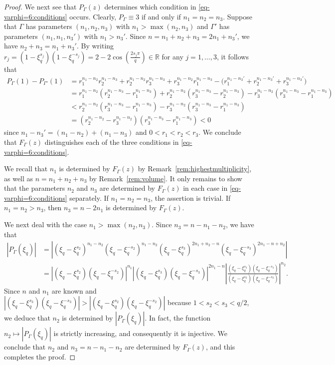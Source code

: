 \documentclass[12pt,a4paper,final]{amsart}
\theoremstyle{plain}
\theoremstyle{definition}
\theoremstyle{remark}
\numberwithin{equation}{section}
\newcommand{\R}{\mathbb R}
\begin{document}
\begin{proof}
We next see that $P_{\Gamma}(z)$ determines which condition in \eqref{eq-varphi=6:conditions} occurs. 
Clearly, $P_{\Gamma}\equiv 3$ if and only if $n_1=n_2=n_3$. 
Suppose that $\Gamma$ has parameters $(n_1,n_2,n_3)$ with $n_1>\max(n_2,n_3)$ and $\Gamma'$ has parameters  $(n_1,n_1,n_3')$ with $n_1>n_3'$. 
Since $n=n_1+n_2+n_3=2n_1+n_3'$, we have $n_2+n_3=n_1+n_3'$. 
By writing $r_j=(1-\xi_q^{s_j})(1-\xi_q^{-s_j}) =2-2\cos(\tfrac{2s_j\pi}{q})\in\R$ for any $j=1,\dots,3$, it follows that
\begin{equation}\label{eq-varphi=6:P(1)-P'(1)}
\begin{aligned}
P_{\Gamma}(1)-P_{\Gamma'}(1)&
	= r_1^{n_1-n_2}r_2^{n_1-n_3} 
	+ r_2^{n_1-n_2}r_3^{n_1-n_3} 
	+ r_3^{n_1-n_2}r_1^{n_1-n_3} 
	-\big(r_1^{n_1-n_3'} +r_2^{n_1-n_3'} +r_3^{n_1-n_3'} \big)
%
%
\\ &
	= r_1^{n_1-n_2} (r_2^{n_1-n_3} - r_1^{n_1-n_3})
	+ r_2^{n_1-n_2} (r_3^{n_1-n_3} - r_2^{n_1-n_3})
	- r_3^{n_1-n_2} (r_3^{n_1-n_3} - r_1^{n_1-n_3}) 
%
%
\\ &
	< r_2^{n_1-n_2} (r_3^{n_1-n_3} - r_1^{n_1-n_3})
	- r_3^{n_1-n_2} (r_3^{n_1-n_3} - r_1^{n_1-n_3}) 
%
%
\\ &
	= (r_2^{n_1-n_2} - r_3^{n_1-n_2})
	(r_3^{n_1-n_3} - r_1^{n_1-n_3})<0
\end{aligned}
\end{equation}
since $n_1-n_3'= (n_1-n_2)+(n_1-n_3)$ and $0<r_1<r_2<r_3$. 
We conclude that $F_{\Gamma}(z)$ distinguishes each of the three conditions in \eqref{eq-varphi=6:conditions}. 

We recall that $n_1$ is determined by $F_{\Gamma}(z)$ by Remark~\ref{rem:highestmultiplicity}, as well as $n=n_1+n_2+n_3$ by Remark~\ref{rem:volume}. 
It only remains to show that the parameters $n_2$ and $n_3$ are determined by $F_{\Gamma}(z)$ in each case in \eqref{eq-varphi=6:conditions} separately. 
If $n_1=n_2=n_3$, the assertion is trivial. 
If $n_1=n_2>n_3$, then $n_3=n-2n_1$ is determined by $F_{\Gamma}(z)$. 

We next deal with the case $n_1>\max(n_2,n_3)$. 
Since $n_3=n-n_1-n_2$, we have that 
\begin{equation}
\begin{aligned}
|P_{\Gamma}(\xi_q)|&= 
\left|
(\xi_q-\xi_q^{s_2})^{n_1-n_2} (\xi_q-\xi_q^{-s_2})^{n_1-n_2} (\xi_q-\xi_q^{s_3})^{2n_1+n_2-n} (\xi_q-\xi_q^{-s_3})^{2n_1-n+n_2}
\right|
%
%
\\ & 
=\left|
(\xi_q-\xi_q^{s_2})(\xi_q-\xi_q^{-s_2})
\right|^{n_1}
\left|
(\xi_q-\xi_q^{s_3})(\xi_q-\xi_q^{-s_3})
\right|^{2n_1-n}
\left|
	\frac{(\xi_q-\xi_q^{s_3}) (\xi_q-\xi_q^{-s_3})}
	{(\xi_q-\xi_q^{s_2})(\xi_q-\xi_q^{-s_2})} 
\right|^{n_2}
.
\end{aligned}
\end{equation}
Since $n$ and $n_1$ are known and $|(\xi_q-\xi_q^{s_3})(\xi_q-\xi_q^{-s_3})|>|(\xi_q-\xi_q^{s_2})(\xi_q-\xi_q^{-s_2})|$ because $1<s_2<s_3<q/2$, we deduce that $n_2$ is determined by $|P_{\Gamma}(\xi_q)|$.
In fact, the function $n_2\mapsto |P_{\Gamma}(\xi_q)|$ is strictly increasing, and consequently it is injective.
We conclude that $n_2$ and $n_3=n-n_1-n_2$ are determined by $F_{\Gamma}(z)$, and this completes the proof. 
\end{proof}
\end{document}
